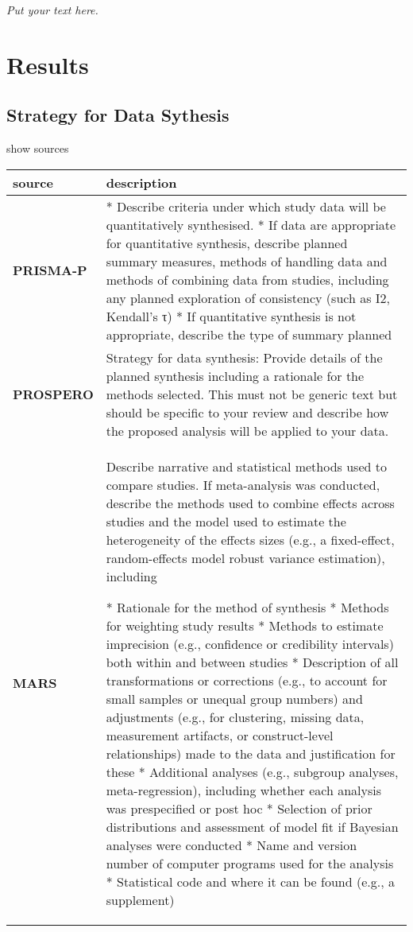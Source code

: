 \documentclass[]{article}
\begin{document}
\emph{Put your text here.}

\hypertarget{results}{%
\section{Results}\label{results}}

\hypertarget{strategy-for-data-sythesis}{%
\subsection{Strategy for Data
Sythesis}\label{strategy-for-data-sythesis}}

show sources

\hypertarget{sfds}{}
\begin{table}[H]
\centering
\begin{tabular}{>{\bfseries}l|l}
\hline
\rowcolor[HTML]{ececec}  source & description\\
\hline
PRISMA-P & * Describe criteria under which study data will be quantitatively synthesised.
* If data are appropriate for quantitative synthesis, describe planned summary measures, methods of handling data and methods of combining data from studies, including any planned exploration of consistency (such as I2, Kendall’s τ)
* If quantitative synthesis is not appropriate, describe the type of summary planned\\
\hline
PROSPERO & Strategy for data synthesis: Provide details of the planned synthesis including a rationale for the methods selected. This must not be generic text but should be specific to your review and describe how the proposed analysis will be applied to your data.\\
\hline
MARS & Describe narrative and statistical methods used to compare studies. If meta-analysis was conducted, describe the methods used to combine effects across studies and the model used to estimate the heterogeneity of the effects sizes (e.g., a fixed-effect, random-effects model robust variance estimation), including

* Rationale for the method of synthesis
* Methods for weighting study results
* Methods to estimate imprecision (e.g., confidence or credibility intervals) both within and between studies
* Description of all transformations or corrections (e.g., to account for small samples or unequal group numbers) and adjustments (e.g., for clustering, missing data, measurement artifacts, or construct-level relationships) made to the data and justification for these
* Additional analyses (e.g., subgroup analyses, meta-regression), including whether each analysis was prespecified or post hoc
* Selection of prior distributions and assessment of model fit if Bayesian analyses were conducted
* Name and version number of computer programs used for the analysis
* Statistical code and where it can be found (e.g., a supplement)\\
\hline
\end{tabular}
\end{table}
\end{document}
